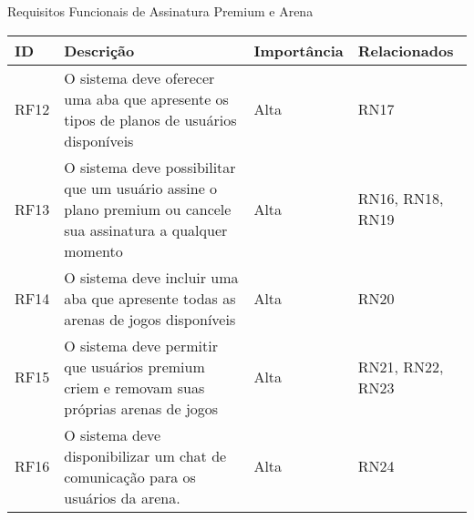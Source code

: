 \begin{quadro}[h!]
\caption{Requisitos Funcionais de Assinatura Premium e Arena}
\label{tab:requisitosfuncionais2}
\begin{longtable}{|p{2.5cm}|p{7.5cm}|p{2.5cm}|p{2.5cm}|}
\hline
ID & Descrição & Importância & Relacionados
\\\hline
RF12 & O sistema deve oferecer uma aba que apresente os tipos de planos de usuários disponíveis & Alta & RN17 \
\\\hline
RF13 & O sistema deve possibilitar que um usuário assine o plano premium ou cancele sua assinatura a qualquer momento & Alta & RN16, RN18, RN19 \
\\\hline
RF14 & O sistema deve incluir uma aba que apresente todas as arenas de jogos disponíveis & Alta & RN20 \
\\\hline
RF15 & O sistema deve permitir que usuários premium criem e removam suas próprias arenas de jogos & Alta & RN21, RN22, RN23 \
\\\hline
RF16 & O sistema deve disponibilizar um chat de comunicação para os usuários da arena. & Alta & RN24 \
\\\hline
\end{longtable}
\fonte{Os Autores.}
\end{quadro}